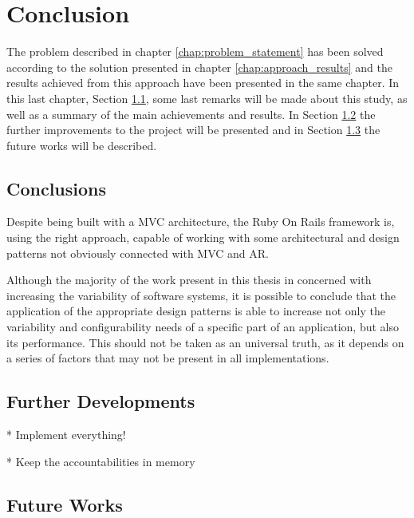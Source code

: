 \chapter{Conclusion}\label{chap:conclusion}

The problem described in chapter \ref{chap:problem_statement} has been solved according to the solution presented in chapter \ref{chap:approach_results} and the results achieved from this approach have been presented in the same chapter. In this last chapter, Section \ref{sec:conclusions}, some last remarks will be made about this study, as well as a summary of the main achievements and results. In Section \ref{sec:further_developments} the further improvements to the project will be presented and in Section \ref{sec:future_works} the future works will be described.

\section{Conclusions}\label{sec:conclusions}

Despite being built with a MVC architecture, the Ruby On Rails framework is, using the right approach, capable of working with some architectural and design patterns not obviously connected with MVC and AR.

Although the majority of the work present in this thesis in concerned with increasing the variability of software systems, it is possible to conclude that the application of the appropriate design patterns is able to increase not only the variability and configurability needs of a specific part of an application, but also its performance. This should not be taken as an universal truth, as it depends on a series of factors that may not be present in all implementations.

\section{Further Developments}\label{sec:further_developments}

 * Implement everything!
 
 * Keep the accountabilities in memory

\section{Future Works}\label{sec:future_works}


